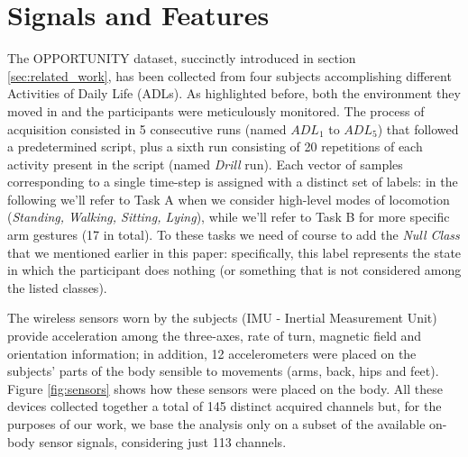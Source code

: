 \section{Signals and Features}
\label{sec:model}

The OPPORTUNITY dataset, succinctly introduced in section \ref{sec:related_work}, has been collected from four subjects accomplishing different Activities of Daily Life (ADLs). As highlighted before, both the environment they moved in and the participants were meticulously monitored.
The process of acquisition consisted in 5 consecutive runs (named $ADL_1$ to $ADL_5$) that followed a predetermined script, plus a sixth run consisting of 20 repetitions of each activity present in the script (named \textit{Drill} run). Each vector of samples corresponding to a single time-step is assigned with a distinct set of labels: in the following we'll refer to Task A when we consider high-level modes of locomotion (\textit{Standing, Walking, Sitting, Lying}), while we'll refer to Task B for more specific arm gestures (17 in total). To these tasks we need of course to add the \textit{Null Class} that we mentioned earlier in this paper: specifically, this label represents the state in which the participant does nothing (or something that is not considered among the listed classes). 

The wireless sensors worn by the subjects (IMU - Inertial Measurement Unit) provide acceleration among the three-axes, rate of turn, magnetic field and orientation information; in addition, 12 accelerometers were placed on the subjects' parts of the body sensible to movements (arms, back, hips and feet). Figure \ref{fig:sensors} shows how these sensors were placed on the body. All these devices collected together a total of 145 distinct acquired channels but, for the purposes of our work, we base the analysis only on a subset of the available on-body sensor signals, considering just 113 channels.

